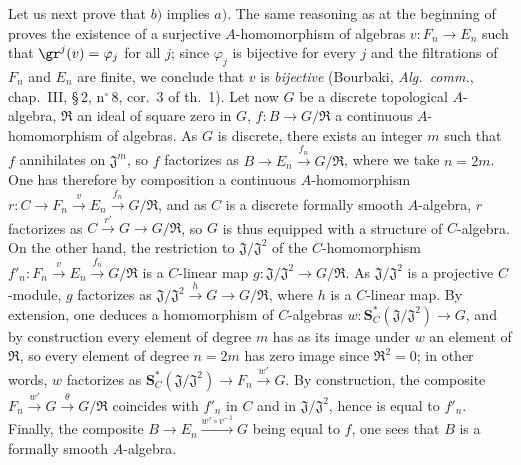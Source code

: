 \begin{env}[19.5.4.3]
\label{0.19.5.4.3}
Let us next prove that $b)$ implies $a)$.
The same reasoning as at the beginning of  proves the existence of a surjective $A$-homomorphism of algebras $v:F_n\to E_n$ such that $\gr^j(v)=\varphi_j$ for all $j$; since $\varphi_j$ is bijective for every $j$ and the filtrations of $F_n$ and $E_n$ are finite, we conclude that $v$ is \emph{bijective} (Bourbaki, \emph{Alg.\ comm.}, chap.~III, \S\,2, n$^\circ$\,8, cor.~3 of th.~1).
Let now $G$ be a discrete topological $A$-algebra, $\mathfrak{R}$ an ideal of square zero in $G$, $f:B\to G/\mathfrak{R}$ a continuous $A$-homomorphism of algebras.
As $G$ is discrete, there exists an integer $m$ such that $f$ annihilates on $\mathfrak{J}^m$, so $f$ factorizes as $B\to E_n\xrightarrow{f_n}G/\mathfrak{R}$, where we take $n=2m$.
One has therefore by composition a continuous $A$-homomorphism $r:C\to F_n\xrightarrow{v}E_n\xrightarrow{f_n}G/\mathfrak{R}$, and as $C$ is a discrete formally smooth $A$-algebra, $r$ factorizes as $C\xrightarrow{r'}G\to G/\mathfrak{R}$, so $G$ is thus equipped with a structure of $C$-algebra.
On the other hand, the restriction to $\mathfrak{J}/\mathfrak{J}^2$ of the $C$-homomorphism $f'_n:F_n\xrightarrow{v}E_n\xrightarrow{f_n}G/\mathfrak{R}$ is a $C$-linear map $g:\mathfrak{J}/\mathfrak{J}^2\to G/\mathfrak{R}$.
As $\mathfrak{J}/\mathfrak{J}^2$ is a projective $C$-module, $g$ factorizes as $\mathfrak{J}/\mathfrak{J}^2\xrightarrow{h}G\to G/\mathfrak{R}$, where $h$ is a $C$-linear map.
By extension, one deduces a homomorphism of $C$-algebras $w:\mathbf{S}_C^*(\mathfrak{J}/\mathfrak{J}^2)\to G$, and by construction every element of degree $m$ has as its image under $w$ an element of $\mathfrak{R}$, so every element of degree $n=2m$ has zero image since $\mathfrak{R}^2=0$;
in other words, $w$ factorizes as $\mathbf{S}_C^*(\mathfrak{J}/\mathfrak{J}^2)\to F_n\xrightarrow{w'}G$.
By construction, the composite $F_n\xrightarrow{w'}G\xrightarrow{\theta}G/\mathfrak{R}$ coincides with $f'_n$ in $C$ and in $\mathfrak{J}/\mathfrak{J}^2$, hence is equal to $f'_n$.
Finally, the composite $B\to E_n\xrightarrow{w'\circ v^{-1}}G$ being equal to $f$, one sees that $B$ is a formally smooth $A$-algebra.
\end{env}

